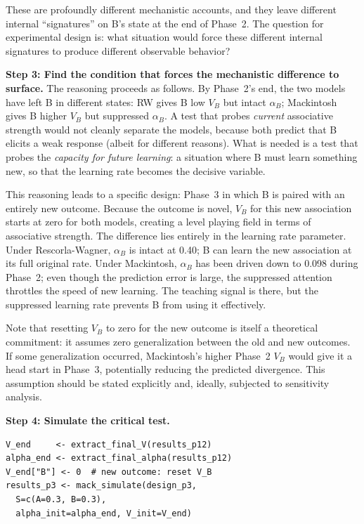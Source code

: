 \documentclass[fleqn,10pt]{wlscirep}
\begin{document}
\begin{linenumbers}
These are profoundly different mechanistic accounts, and they leave different internal ``signatures'' on B's state at the end of Phase~2. The question for experimental design is: what situation would force these different internal signatures to produce different observable behavior?

\textbf{Step 3: Find the condition that forces the mechanistic difference to surface.} The reasoning proceeds as follows. By Phase~2's end, the two models have left B in different states: RW gives B low $V_B$ but intact $\alpha_B$; Mackintosh gives B higher $V_B$ but suppressed $\alpha_B$. A test that probes \emph{current} associative strength would not cleanly separate the models, because both predict that B elicits a weak response (albeit for different reasons). What is needed is a test that probes the \emph{capacity for future learning}: a situation where B must learn something new, so that the learning rate becomes the decisive variable.

This reasoning leads to a specific design: Phase~3 in which B is paired with an entirely new outcome. Because the outcome is novel, $V_B$ for this new association starts at zero for both models, creating a level playing field in terms of associative strength. The difference lies entirely in the learning rate parameter. Under Rescorla-Wagner, $\alpha_B$ is intact at 0.40; B can learn the new association at its full original rate. Under Mackintosh, $\alpha_B$ has been driven down to 0.098 during Phase~2; even though the prediction error is large, the suppressed attention throttles the speed of new learning. The teaching signal is there, but the suppressed learning rate prevents B from using it effectively.

Note that resetting $V_B$ to zero for the new outcome is itself a theoretical commitment: it assumes zero generalization between the old and new outcomes. If some generalization occurred, Mackintosh's higher Phase~2 $V_B$ would give it a head start in Phase~3, potentially reducing the predicted divergence. This assumption should be stated explicitly and, ideally, subjected to sensitivity analysis.

\textbf{Step 4: Simulate the critical test.}
\begin{verbatim}
V_end     <- extract_final_V(results_p12)
alpha_end <- extract_final_alpha(results_p12)
V_end["B"] <- 0  # new outcome: reset V_B
results_p3 <- mack_simulate(design_p3,
  S=c(A=0.3, B=0.3),
  alpha_init=alpha_end, V_init=V_end)
\end{verbatim}


\end{linenumbers}
\end{document}

